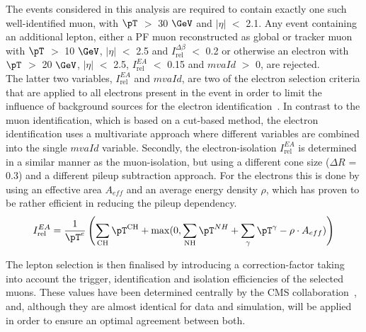 The events considered in this analysis are required to contain exactly one such well-identified muon, with $\pT$ $>$ 30 $\GeV$ and $\vert \eta \vert$ $<$ 2.1. Any event containing an additional lepton, either a PF muon reconstructed as global or tracker muon with $\pT$ $>$ 10 $\GeV$, $\vert \eta \vert$ $<$ 2.5 and $I_{\textrm{rel}}^{\Delta \beta}$ $<$ 0.2 or otherwise an electron with $\pT$ $>$ 20 $\GeV$, $\vert \eta \vert$ $<$ 2.5, $I_{\textrm{rel}}^{EA}$ $<$ 0.15 and $mvaId$ $>$ 0, are rejected. 
\\
The latter two variables, $I_{\textrm{rel}}^{EA}$ and $mvaId$, are two of the electron selection criteria that are applied to all electrons present in the event in order to limit the influence of background sources for the electron identification~\cite{ElId8TeV}. In contrast to the muon identification, which is based on a cut-based method, the electron identification uses a multivariate approach where different variables are combined into the single $mvaId$ variable.
Secondly, the electron-isolation $I_{\textrm{rel}}^{EA}$ is determined in a similar manner as the muon-isolation, but using a different cone size ($\Delta R$ = 0.3) and a different pileup subtraction approach. For the electrons this is done by using an effective area $A_{eff}$ and an average energy density $\rho$, which has proven to be rather efficient in reducing the pileup dependency.%
\begin{equation}\label{eq::DeltaBetaIso}
 I_{\textrm{rel}}^{EA} = \frac{1}{\pT^{e}} \left( \sum_{\textrm{CH}} \pT^{\textrm{CH}} + \max(0, \sum_{\textrm{NH}} \pT^{NH} + \sum_{\gamma} \pT^{\gamma} - \rho \cdot A_{eff}) \right)
\end{equation}

The lepton selection is then finalised by introducing a correction-factor taking into account the trigger, identification and isolation efficiencies of the selected muons.
These values have been determined centrally by the CMS collaboration~\cite{MuonPerf8TeV}, and, although they are almost identical for data and simulation, will be applied in order to ensure an optimal agreement between both.

